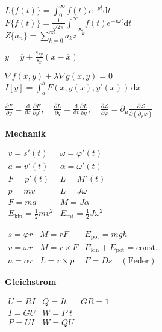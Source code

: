 \documentclass[a4paper, 10pt, fleqn, twocolumn, twoside]{article}
\newcommand{\ds}{\displaystyle}
\begin{document}
\(\ds L\{f(t)\} = \int_0^{\infty} f(t)e^{-pt}\mathrm dt\)\\
\(\ds F\{f(t)\} = \frac{1}{\sqrt{2\pi}}\int_{-\infty}^{\infty}
f(t)e^{-i\omega t}\mathrm dt\)\\
\(\ds Z\{a_n\} = \sum_{k=0}^\infty a_k z^{-k}\)

\(\ds y = \overline y + \frac{s_{xy}}{s_x}(x-\overline x)\)

\(\nabla f(x,y) + \lambda\nabla g(x,y)=0\)\\
\(I[y]=\ds\int_a^b F(x,y(x),y'(x))\,\mathrm dx\)

\(\ds \frac{\partial F}{\partial y}
=\frac{\mathrm d}{\mathrm dx} \frac{\partial F}{\partial y'},\quad
\ds \frac{\partial L}{\partial q}
=\frac{\mathrm d}{\mathrm dt} \frac{\partial L}{\partial\dot q},\quad
\ds \frac{\partial\mathcal L}{\partial\varphi}
=\partial_\mu \frac{\partial\mathcal L}{\partial(\partial_\mu\varphi)}\)


\newpage


\textbf{Mechanik}

\({}\!\!\!\begin{array}{l|l}
v = s'(t) & \omega = \varphi'(t)\\
a = v'(t) & \alpha = \omega'(t)\\
F = p'(t) & L = M'(t)\\
p = mv & L = J\omega\\
F = ma & M = J\alpha\\
E_\mathrm{kin} = \frac{1}{2}mv^2
& E_\mathrm{rot} = \frac{1}{2}J\omega^2
\end{array}\)

\({}\!\!\!\begin{array}{l|l|l}
s=\varphi r& M=rF & E_\mathrm{pot} = mgh\\
v=\omega r & M=r\times F & E_\mathrm{kin}+E_\mathrm{pot} = \mathrm{const.}\\
a=\alpha r& L=r\times p & F = Ds\quad \mathrm{(Feder)}
\end{array}\)



\textbf{Gleichstrom}

\({}\!\!\!\begin{array}{l|l|l}
U=RI & Q=It & GR=1\\
I=GU & W=P\;\!t\\
P=UI & W=QU\\
\end{array}\)
\end{document}
